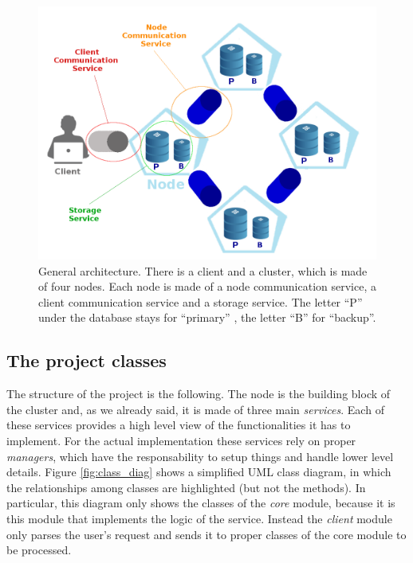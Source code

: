 \documentclass{article}
\begin{document}
\begin{figure}[h]
\includegraphics[scale=0.41]{architecture}
\caption{General architecture. There is a client and a cluster, which is made of four nodes. Each node is made of a node communication service, a client communication service and a storage service. The letter ``P'' under the database stays for ``primary'' , the letter ``B'' for ``backup''.}
\label{fig:architecture}
\end{figure}

\subsection{The project classes} 
The structure of the project is the following. The node is the building block of the cluster and, as we already said, it is made of three main \textit{services}. Each of these services provides a high level view of the functionalities it has to implement. For the actual implementation these services rely on proper \textit{managers}, which have the responsability to setup things and handle lower level details. Figure \ref{fig:class_diag} shows a simplified UML class diagram, in which the relationships among classes are highlighted (but not the methods). In particular, this diagram only shows the classes of the \textit{core} module, because it is this module that implements the logic of the service. Instead the \textit{client} module only parses the user's request and sends it to proper classes of the core module to be processed. \\
\end{document}
